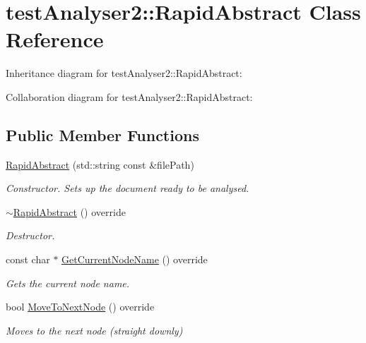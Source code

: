 \hypertarget{classtestAnalyser2_1_1RapidAbstract}{}\section{test\+Analyser2\+::Rapid\+Abstract Class Reference}
\label{classtestAnalyser2_1_1RapidAbstract}


Inheritance diagram for test\+Analyser2\+::Rapid\+Abstract\+:


Collaboration diagram for test\+Analyser2\+::Rapid\+Abstract\+:
\subsection*{Public Member Functions}
\begin{DoxyCompactItemize}
\item 
\mbox{\hyperlink{classtestAnalyser2_1_1RapidAbstract_a88b6e63f4d070a4274904e5dfd4d5941}{Rapid\+Abstract}} (std\+::string const \&file\+Path)
\begin{DoxyCompactList}\small\item\em Constructor. Sets up the document ready to be analysed. \end{DoxyCompactList}\item 
\mbox{\label{classtestAnalyser2_1_1RapidAbstract_aabbdd973fe1c988f458c2b857060a66f}} 
\mbox{\hyperlink{classtestAnalyser2_1_1RapidAbstract_aabbdd973fe1c988f458c2b857060a66f}{$\sim$\+Rapid\+Abstract}} () override
\begin{DoxyCompactList}\small\item\em Destructor. \end{DoxyCompactList}\item 
const char $\ast$ \mbox{\hyperlink{classtestAnalyser2_1_1RapidAbstract_a42fff5c266c24f6149f84f3b024457c7}{Get\+Current\+Node\+Name}} () override
\begin{DoxyCompactList}\small\item\em Gets the current node name. \end{DoxyCompactList}\item 
bool \mbox{\hyperlink{classtestAnalyser2_1_1RapidAbstract_a49c72b683d3c31e7aca432de5d97711c}{Move\+To\+Next\+Node}} () override
\begin{DoxyCompactList}\small\item\em Moves to the next node (straight downly) \end{DoxyCompactList}\item 

\end{DoxyCompactItemize}
